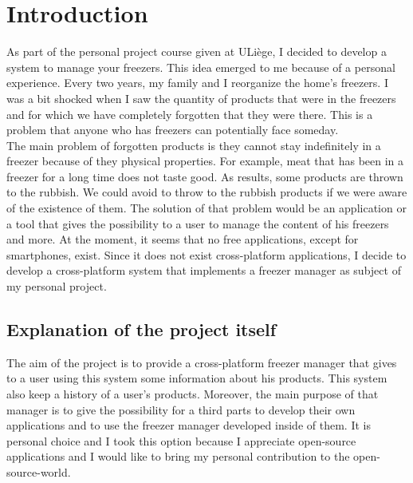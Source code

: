 \section{Introduction}
As part of the personal project course given at ULiège, I decided to develop a system to manage your freezers. This idea emerged to me because of a personal experience. Every two years, my family and I reorganize the home's freezers. I was a bit shocked when I saw the quantity of products that were in the freezers and for which we have completely forgotten that they were there. This is a problem that anyone who has freezers can potentially face someday. \\

The main problem of forgotten products is they cannot stay indefinitely in a freezer because of they physical properties. For example, meat that has been in a freezer for a long time does not taste good. As results, some products are thrown to the rubbish. We could avoid to throw to the rubbish products if we were aware of the existence of them. The solution of that problem would be an application or a tool that gives the possibility to a user to manage the content of his freezers and more. At the moment, it seems that no free applications, except for smartphones, exist. Since it does not exist cross-platform applications, I decide to develop a cross-platform system that implements a freezer manager as subject of my personal project.

\subsection{Explanation of the project itself}
The aim of the project is to provide a cross-platform freezer manager that gives to a user using this system some information about his products. This system also keep a history of a user's products. Moreover, the main purpose of that manager is to give the possibility for a third parts to develop their own applications and to use the freezer manager developed inside of them. It is personal choice and I took this option because I appreciate open-source applications and I would like to bring my personal contribution to the open-source-world. \\


